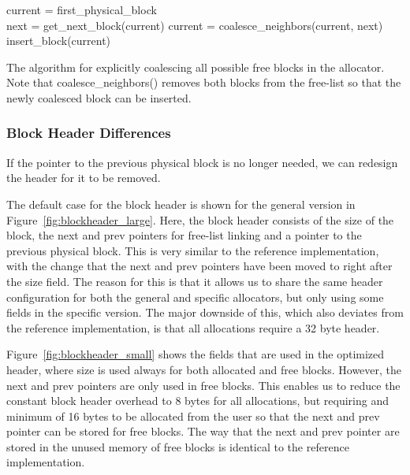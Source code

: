 \begin{algorithm}[H]
current = first\_physical\_block\\
 {
next = get\_next\_block(current)\;
 {
    current = coalesce\_neighbors(current, next)\;
    insert\_block(current)\;
}
}
\label{algorithm:coalesce_blocks}
\caption{The algorithm for explicitly coalescing all possible free blocks in the allocator. Note that coalesce\_neighbors() removes both blocks from the free-list so that the newly coalesced block can be inserted.}
\end{algorithm}

\subsubsection{Block Header Differences}

If the pointer to the previous physical block is no longer needed, we can redesign the header for it to be removed. 

The default case for the block header is shown for the general version in Figure~\ref{fig:blockheader_large}. Here, the block header consists of the size of the block, the next and prev pointers for free-list linking and a pointer to the previous physical block. This is very similar to the reference implementation, with the change that the next and prev pointers have been moved to right after the size field. The reason for this is that it allows us to share the same header configuration for both the general and specific allocators, but only using some fields in the specific version. The major downside of this, which also deviates from the reference implementation, is that all allocations require a 32 byte header.


Figure~\ref{fig:blockheader_small} shows the fields that are used in the optimized header, where size is used always for both allocated and free blocks. However, the next and prev pointers are only used in free blocks. This enables us to reduce the constant block header overhead to 8 bytes for all allocations, but requiring and minimum of 16 bytes to be allocated from the user so that the next and prev pointer can be stored for free blocks. The way that the next and prev pointer are stored in the unused memory of free blocks is identical to the reference implementation.

